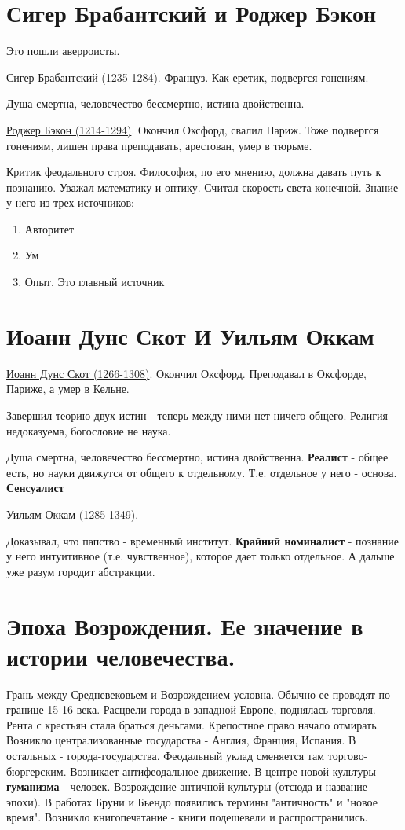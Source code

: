 \documentclass[12pt,a4paper]{article}
\begin{document}
\section{Сигер Брабантский и Роджер Бэкон}
Это пошли аверроисты.

\underline{Сигер Брабантский (1235-1284)}. Француз. Как еретик, подвергся гонениям.

Душа смертна, человечество бессмертно, истина двойственна.
 
\underline{Роджер Бэкон (1214-1294)}. Окончил Оксфорд, свалил  Париж. Тоже подвергся гонениям, лишен права преподавать, арестован, умер в тюрьме.

Критик феодального строя. Философия, по его мнению, должна давать путь к познанию. Уважал математику и оптику. Считал скорость света конечной. Знание у него из трех источников:
\begin{enumerate}
\item Авторитет
\item Ум
\item Опыт. Это главный источник
\end{enumerate}

\section{Иоанн Дунс Скот И Уильям Оккам}

\underline{Иоанн Дунс Скот (1266-1308)}. Окончил Оксфорд. Преподавал в Оксфорде, Париже, а умер в Кельне.

Завершил теорию двух истин - теперь между ними нет ничего общего. Религия недоказуема, богословие не наука. 

Душа смертна, человечество бессмертно, истина двойственна. \textbf{Реалист} - общее есть, но науки движутся от общего к отдельному. Т.е. отдельное у  него - основа. \textbf{Сенсуалист}
 
\underline{Уильям Оккам (1285-1349)}. 

Доказывал, что папство - временный институт. \textbf{Крайний номиналист} - познание у него интуитивное (т.е. чувственное), которое дает только отдельное. А дальше уже разум городит абстракции.

\section{Эпоха Возрождения. Ее значение в истории человечества.}
Грань между Средневековьем и Возрождением условна. Обычно ее проводят по границе 15-16 века. Расцвели города в западной Европе, поднялась торговля. Рента с крестьян стала браться деньгами. Крепостное право начало отмирать. Возникло централизованные государства - Англия, Франция, Испания. В остальных - города-государства. Феодальный уклад сменяется там торгово-бюргерским. Возникает антифеодальное движение. В центре новой культуры - \textbf{гуманизма} - человек. Возрождение античной культуры (отсюда и название эпохи). В работах Бруни и Бьендо появились термины "античность" и "новое время". Возникло книгопечатание - книги подешевели и распространились. 
\end{document}
